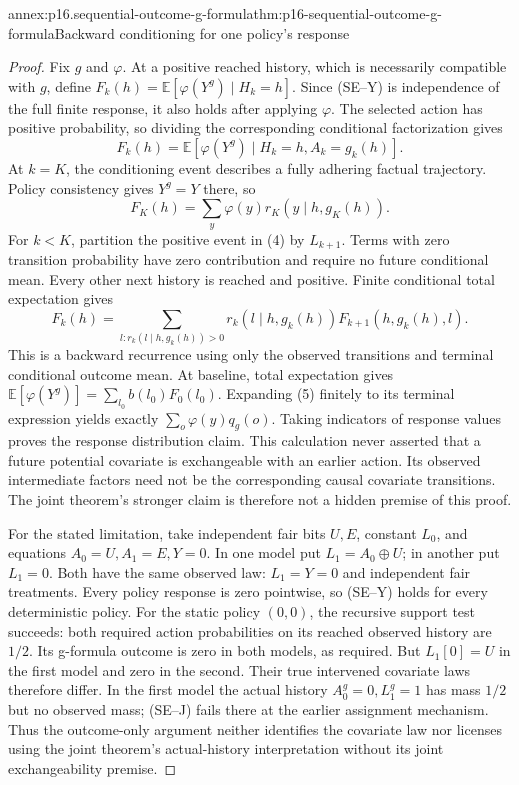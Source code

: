 \begin{annexitem}{annex:p16.sequential-outcome-g-formula}{thm:p16-sequential-outcome-g-formula}{Backward conditioning for one policy's response}
\begin{proof}
Fix \(g\) and \(\varphi\). At a positive reached history, which is
necessarily compatible with \(g\), define
\(F_k(h)=\mathbb E[\varphi(Y^g)\mid H_k=h]\).
Since (SE--Y) is independence of the full finite response, it also holds
after applying \(\varphi\). The selected action has positive probability,
so dividing the corresponding conditional factorization gives
\[
 F_k(h)=\mathbb E[\varphi(Y^g)\mid H_k=h,A_k=g_k(h)].       \tag{4}
\]
At \(k=K\), the conditioning event describes a fully adhering factual
trajectory. Policy consistency gives \(Y^g=Y\) there, so
\[
 F_K(h)=\sum_y\varphi(y)r_K(y\mid h,g_K(h)).
\]
For \(k<K\), partition the positive event in (4) by \(L_{k+1}\).
Terms with zero transition probability have zero contribution and require
no future conditional mean. Every other next history is reached and
positive. Finite conditional total expectation gives
\[
 F_k(h)=\sum_{l:r_k(l\mid h,g_k(h))>0}
                  r_k(l\mid h,g_k(h))F_{k+1}(h,g_k(h),l).   \tag{5}
\]
This is a backward recurrence using only the observed transitions and
terminal conditional outcome mean. At baseline, total expectation gives
\(\mathbb E[\varphi(Y^g)]=\sum_{l_0}b(l_0)F_0(l_0)\).
Expanding (5) finitely to its terminal expression yields exactly
\(\sum_o\varphi(y)q_g(o)\). Taking indicators of response values proves
the response distribution claim. This calculation never asserted that a
future potential covariate is exchangeable with an earlier action. Its
observed intermediate factors need not be the corresponding causal
covariate transitions. The joint theorem's stronger claim is therefore
not a hidden premise of this proof.

For the stated limitation, take independent fair bits \(U,E\), constant
\(L_0\), and equations \(A_0=U,A_1=E,Y=0\). In one model put
\(L_1=A_0\oplus U\); in another put \(L_1=0\). Both have the same
observed law: \(L_1=Y=0\) and independent fair treatments. Every policy
response is zero pointwise, so (SE--Y) holds for every deterministic policy.
For the static policy \((0,0)\), the recursive support test succeeds:
both required action probabilities on its reached observed history are
\(1/2\). Its g-formula outcome is zero in both models, as required.
But \(L_1[0]=U\) in the first model and zero in the second. Their true
intervened covariate laws therefore differ. In the first model the actual
history \(A_0^g=0,L_1^g=1\) has mass \(1/2\) but no observed mass;
(SE--J) fails there at the earlier assignment mechanism. Thus the
outcome-only argument neither identifies the covariate law nor licenses
using the joint theorem's actual-history interpretation without its joint
exchangeability premise.
\end{proof}
\end{annexitem}

